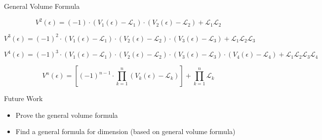 \documentclass{if-beamer}
\newcommand{\SL}{\mathcal{L}}
\begin{document}
\begin{frame}{General Volume Formula}

$$V^2(\epsilon)= (-1)\cdot(V_1(\epsilon)-\SL_1)\cdot(V_2(\epsilon)-\SL_2) + \SL_1\SL_2$$

$$ V^3(\epsilon) = (-1)^2\cdot(V_1(\epsilon)-\SL_1)\cdot(V_2(\epsilon)-\SL_2)\cdot(V_3(\epsilon)-\SL_3) + \SL_1\SL_2\SL_3$$

$$ V^4(\epsilon)= (-1)^3\cdot(V_1(\epsilon)-\SL_1)\cdot(V_2(\epsilon)-\SL_2)\cdot(V_3(\epsilon)-\SL_3)\cdot(V_4(\epsilon)-\SL_4) + \SL_1\SL_2\SL_3\SL_4$$

$$V^{n}(\epsilon) =\left[ (-1)^{n-1} \cdot \displaystyle \prod_{k = 1}^{n}(V_k(\epsilon)-\SL_k)\right] +\prod_{k = 1}^{n} \SL_k$$

\end{frame}

\begin{frame}{Future Work}
\begin{itemize}

\item Prove the general volume formula

\item Find a general formula for dimension (based on general volume formula)

\end{itemize}
\end{frame}
\end{document}
